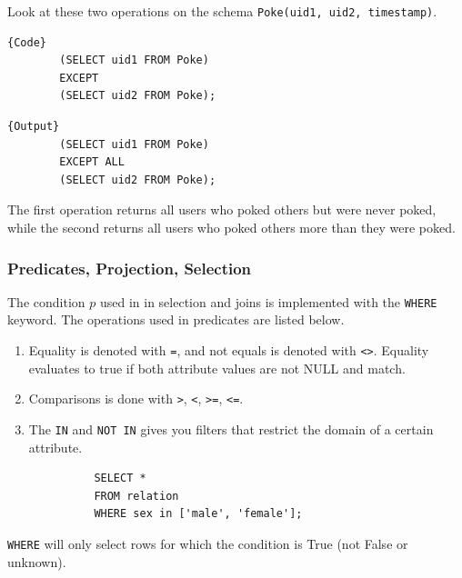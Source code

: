     \begin{example}
      \label{ex:interpretation-of-except-all}
      Look at these two operations on the schema \texttt{Poke(uid1, uid2, timestamp)}. 

      \noindent\begin{minipage}{.5\textwidth}
      \begin{lstlisting}[]{Code}
        (SELECT uid1 FROM Poke) 
        EXCEPT 
        (SELECT uid2 FROM Poke); 
      \end{lstlisting}
      \end{minipage}
      \hfill
      \begin{minipage}{.49\textwidth}
      \begin{lstlisting}[]{Output}
        (SELECT uid1 FROM Poke) 
        EXCEPT ALL
        (SELECT uid2 FROM Poke); 
      \end{lstlisting}
      \end{minipage}
      The first operation returns all users who poked others but were never poked, while the second returns all users who poked others more than they were poked. 
    \end{example}

  \subsubsection{Predicates, Projection, Selection}

    \begin{definition}
      \label{def:condition-predicate}
      The condition $p$ used in in selection and joins is implemented with the \texttt{WHERE} keyword. The operations used in predicates are listed below. 
      \begin{enumerate}
        \item Equality is denoted with \texttt{=}, and not equals is denoted with \texttt{<>}. Equality evaluates to true if both attribute values are not NULL and match.  
        \item Comparisons is done with \texttt{>}, \texttt{<}, \texttt{>=}, \texttt{<=}. 
        \item The \texttt{IN} and \texttt{NOT IN} gives you filters that restrict the domain of a certain attribute. 
        \begin{lstlisting}
          SELECT * 
          FROM relation 
          WHERE sex in ['male', 'female']; 
        \end{lstlisting}
      \end{enumerate} 
      \texttt{WHERE} will only select rows for which the condition is True (not False or unknown). 
    \end{definition}

